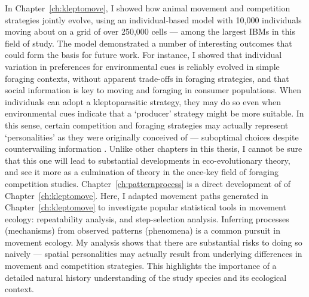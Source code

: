 In Chapter~\ref{ch:kleptomove}, I showed how animal movement and competition strategies jointly evolve, using an individual-based model with 10,000 individuals moving about on a grid of over 250,000 cells --- among the largest IBMs in this field of study.
The model demonstrated a number of interesting outcomes that could form the basis for future work.
For instance, I showed that individual variation in preferences for environmental cues is reliably evolved in simple foraging contexts, without apparent trade-offs in foraging strategies, and that social information is key to moving and foraging in consumer populations.
When individuals can adopt a kleptoparasitic strategy, they may do so even when environmental cues indicate that a `producer' strategy \parencite{beauchamp2008} might be more suitable.
In this sense, certain competition and foraging strategies may actually represent `personalities' as they were originally conceived of --- suboptimal choices despite countervailing information \parencite{sih2004}.
Unlike other chapters in this thesis, I cannot be sure that this one will lead to substantial developments in eco-evolutionary theory, and see it more as a culmination of theory in the once-key field of foraging competition studies.
Chapter~\ref{ch:patternprocess} is a direct development of of Chapter~\ref{ch:kleptomove}.
Here, I adapted movement paths generated in Chapter~\ref{ch:kleptomove} to investigate popular statistical tools in movement ecology: repeatability analysis, and step-selection analysis.
Inferring processes (mechanisms) from observed patterns (phenomena) is a common pursuit in movement ecology.
My analysis shows that there are substantial risks to doing so naively --- spatial personalities \parencite{stuber2022} may actually result from underlying differences in movement and competition strategies.
This highlights the importance of a detailed natural history understanding of the study species and its ecological context.


